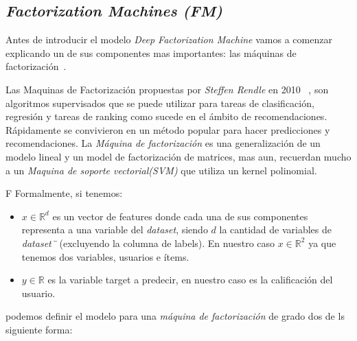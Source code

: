\documentclass[11pt,a4paper,twoside]{thesis}
\begin{document}
\subsection{\textit{Factorization Machines (FM)}}

Antes de introducir el modelo \textit{Deep Factorization Machine} vamos a
comenzar explicando un de sus componentes mas importantes: las máquinas de
factorización~\cite{didlfm, zhangdive}.

Las Maquinas de Factorización propuestas por \textit{Steffen Rendle} en 2010
~\cite{fm}, son algoritmos supervisados que se puede utilizar para tareas de
clasificación, regresión y tareas de ranking como sucede en el ámbito de
recomendaciones. Rápidamente se convivieron en un método popular para hacer
predicciones y recomendaciones. La \textit{Máquina de factorización} es una
generalización de un modelo lineal y un model de factorización de matrices, mas
aun, recuerdan mucho a un \textit{Maquina de soporte vectorial(SVM)} que
utiliza un kernel polinomial.

F Formalmente, si tenemos:

\begin{itemize}
	\item $x\in\mathbb{R}^{d}$ es un vector de features donde cada una de sus componentes representa a una variable del \textit{dataset}, siendo $d$ la cantidad de variables de \textit{dataset¨} (excluyendo la columna de labels). En nuestro caso $x\in\mathbb{R}^{2}$ ya que tenemos dos variables, usuarios e ítems.
	\item $y\in\mathbb{R}$ es la variable target a predecir, en nuestro caso es la calificación del usuario.
\end{itemize}

podemos definir el modelo para una \textit{máquina de factorización} de grado
dos de ls siguiente forma:
\end{document}

